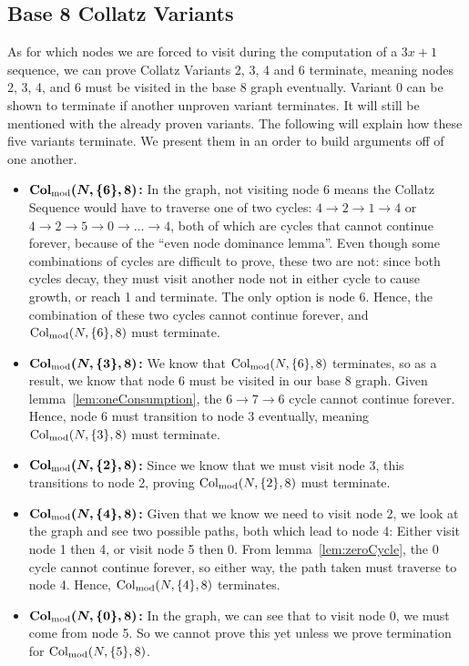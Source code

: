 \subsection{Base 8 Collatz Variants} \label{subsubsec:base8subprob}
As for which nodes we are forced to visit during the computation of a $3x+1$ sequence, we can prove Collatz Variants 2, 3, 4 and 6 terminate, meaning nodes 2, 3, 4, and 6 must be visited in the base 8 graph eventually. Variant 0 can be shown to terminate if another unproven variant terminates. It will still be mentioned with the already proven variants. The following will explain how these five variants terminate. We present them in an order to build arguments off of one another.
\begin{itemize}
    \item \textbf{$\boldsymbol{\mathrm{Col}_{\text{mod}}(N,\{6\},8)}$:} In the graph, not visiting node $6$ means the Collatz Sequence would have to traverse one of two cycles: $4 \rightarrow 2 \rightarrow 1 \rightarrow 4$ or $4 \rightarrow 2 \rightarrow 5 \rightarrow 0 \rightarrow \ldots \rightarrow 4$, both of which are cycles that cannot continue forever, because of the ``even node dominance lemma''. Even though some combinations of cycles are difficult to prove, these two are not: since both cycles decay, they must visit another node not in either cycle to cause growth, or reach 1 and terminate. The only option is node 6. Hence, the combination of these two cycles cannot continue forever, and $\mathrm{Col}_{\text{mod}}(N,\{6\},8)$ must terminate.
    \item \textbf{$\boldsymbol{\mathrm{Col}_{\text{mod}}(N,\{3\},8)}$:} We know that $\mathrm{Col}_{\text{mod}}(N,\{6\},8)$ terminates, so as a result, we know that node 6 must be visited in our base 8 graph.  Given lemma~\ref{lem:oneConsumption}, the $6 \rightarrow 7 \rightarrow 6$ cycle cannot continue forever. Hence, node 6 must transition to node 3 eventually, meaning $\mathrm{Col}_{\text{mod}}(N,\{3\},8)$ must terminate.
    \item \textbf{$\boldsymbol{\mathrm{Col}_{\text{mod}}(N,\{2\},8)}$:} Since we know that we must visit node 3, this transitions to node 2, proving $\mathrm{Col}_{\text{mod}}(N,\{2\},8)$ must terminate.
    \item \textbf{$\boldsymbol{\mathrm{Col}_{\text{mod}}(N,\{4\},8)}$:} Given that we know we need to visit node 2, we look at the graph and see two possible paths, both which lead to node 4: Either visit node 1 then 4, or visit node 5 then 0. From lemma~\ref{lem:zeroCycle}, the 0 cycle cannot continue forever, so either way, the path taken must traverse to node 4. Hence, $\mathrm{Col}_{\text{mod}}(N,\{4\},8)$ terminates.
    \item \textbf{$\boldsymbol{\mathrm{Col}_{\text{mod}}(N,\{0\},8)}$:} In the graph, we can see that to visit node 0, we must come from node 5. So we cannot prove this yet unless we prove termination for $\mathrm{Col}_{\text{mod}}(N,\{5\},8)$.
\end{itemize}
